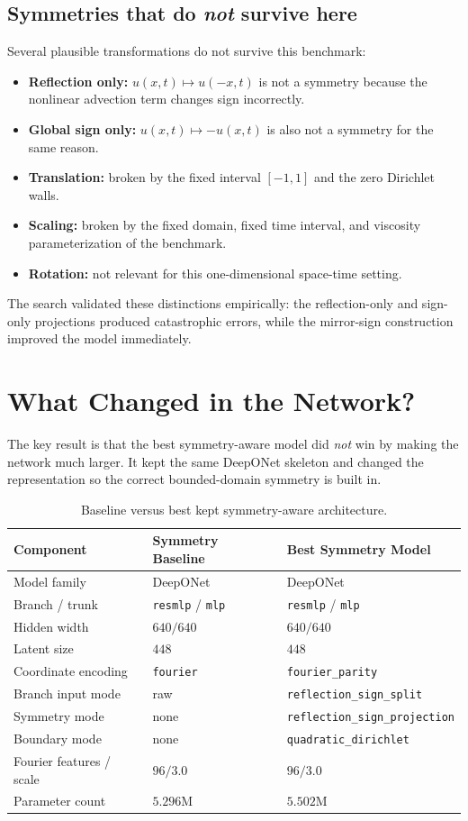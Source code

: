 \documentclass[11pt]{article}
\begin{document}
\subsection{Symmetries that do \emph{not} survive here}
Several plausible transformations do not survive this benchmark:
\begin{itemize}[leftmargin=1.5em]
\item \textbf{Reflection only:} $u(x,t)\mapsto u(-x,t)$ is not a symmetry because the nonlinear advection term changes sign incorrectly.
\item \textbf{Global sign only:} $u(x,t)\mapsto -u(x,t)$ is also not a symmetry for the same reason.
\item \textbf{Translation:} broken by the fixed interval $[-1,1]$ and the zero Dirichlet walls.
\item \textbf{Scaling:} broken by the fixed domain, fixed time interval, and viscosity parameterization of the benchmark.
\item \textbf{Rotation:} not relevant for this one-dimensional space-time setting.
\end{itemize}

The search validated these distinctions empirically: the reflection-only and sign-only projections produced catastrophic errors, while the mirror-sign construction improved the model immediately.

\section{What Changed in the Network?}
The key result is that the best symmetry-aware model did \emph{not} win by making the network much larger. It kept the same DeepONet skeleton and changed the representation so the correct bounded-domain symmetry is built in.

\begin{table}[ht]
\centering
\begin{tabular}{@{}lll@{}}
\toprule
Component & Symmetry Baseline & Best Symmetry Model \\
\midrule
Model family & DeepONet & DeepONet \\
Branch / trunk & \texttt{resmlp} / \texttt{mlp} & \texttt{resmlp} / \texttt{mlp} \\
Hidden width & $640 / 640$ & $640 / 640$ \\
Latent size & $448$ & $448$ \\
Coordinate encoding & \texttt{fourier} & \texttt{fourier\_parity} \\
Branch input mode & raw & \texttt{reflection\_sign\_split} \\
Symmetry mode & none & \texttt{reflection\_sign\_projection} \\
Boundary mode & none & \texttt{quadratic\_dirichlet} \\
Fourier features / scale & $96 / 3.0$ & $96 / 3.0$ \\
Parameter count & $5.296$M & $5.502$M \\
\bottomrule
\end{tabular}
\caption{Baseline versus best kept symmetry-aware architecture.}
\end{table}
\end{document}
